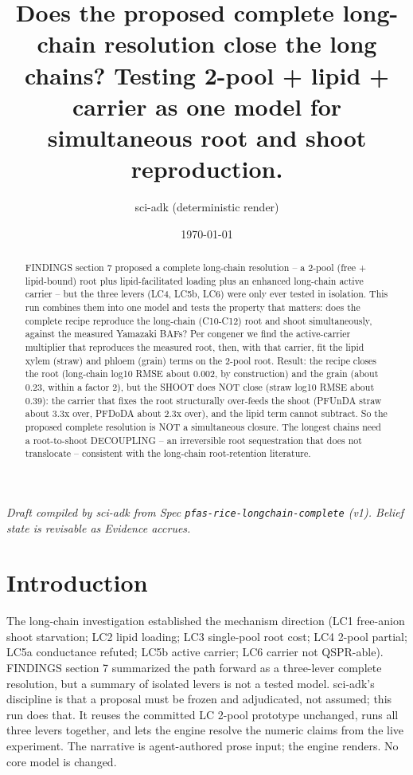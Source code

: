 \documentclass{article}
\title{Does the proposed complete long-chain resolution close the long chains? Testing 2-pool + lipid + carrier as one model for simultaneous root and shoot reproduction.}
\author{sci-adk (deterministic render)}
\date{\today}
\begin{document}
\maketitle

\noindent\textit{Draft compiled by sci-adk from Spec \texttt{pfas-rice-longchain-complete} (v1). Belief state is revisable as Evidence accrues.}

\begin{abstract}
FINDINGS section 7 proposed a complete long-chain resolution -- a 2-pool (free + lipid-bound) root plus lipid-facilitated loading plus an enhanced long-chain active carrier -- but the three levers (LC4, LC5b, LC6) were only ever tested in isolation. This run combines them into one model and tests the property that matters: does the complete recipe reproduce the long-chain (C10-C12) root and shoot simultaneously, against the measured Yamazaki BAFs? Per congener we find the active-carrier multiplier that reproduces the measured root, then, with that carrier, fit the lipid xylem (straw) and phloem (grain) terms on the 2-pool root. Result: the recipe closes the root (long-chain log10 RMSE about 0.002, by construction) and the grain (about 0.23, within a factor 2), but the SHOOT does NOT close (straw log10 RMSE about 0.39): the carrier that fixes the root structurally over-feeds the shoot (PFUnDA straw about 3.3x over, PFDoDA about 2.3x over), and the lipid term cannot subtract. So the proposed complete resolution is NOT a simultaneous closure. The longest chains need a root-to-shoot DECOUPLING -- an irreversible root sequestration that does not translocate -- consistent with the long-chain root-retention literature.
\end{abstract}

\section{Introduction}
The long-chain investigation established the mechanism direction (LC1 free-anion shoot starvation; LC2 lipid loading; LC3 single-pool root cost; LC4 2-pool partial; LC5a conductance refuted; LC5b active carrier; LC6 carrier not QSPR-able). FINDINGS section 7 summarized the path forward as a three-lever complete resolution, but a summary of isolated levers is not a tested model. sci-adk's discipline is that a proposal must be frozen and adjudicated, not assumed; this run does that. It reuses the committed LC 2-pool prototype unchanged, runs all three levers together, and lets the engine resolve the numeric claims from the live experiment. The narrative is agent-authored prose input; the engine renders. No core model is changed.
\end{document}
